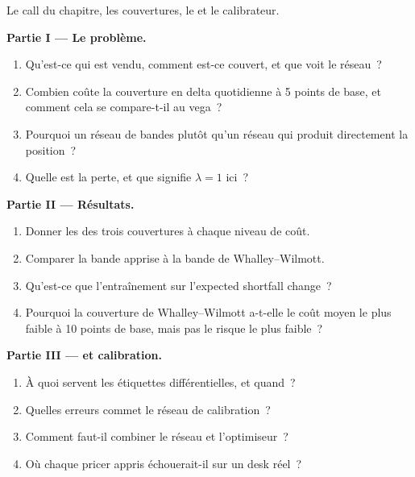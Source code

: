 \begin{problem}\label{pb:ml:deep-hedging-and-machine-learning-in-pricing:1}
Le call du chapitre, les couvertures, le  et le calibrateur.

\medskip\noindent\textbf{Partie I --- Le problème.}
\begin{enumerate}
\item Qu'est-ce qui est vendu, comment est-ce couvert, et que voit le réseau~?
\item Combien coûte la couverture en delta quotidienne à 5 points de base, et comment cela se compare-t-il au vega~?
\item Pourquoi un réseau de bandes plutôt qu'un réseau qui produit directement la position~?
\item Quelle est la perte, et que signifie $\lambda = 1$ ici~?
\end{enumerate}

\medskip\noindent\textbf{Partie II --- Résultats.}
\begin{enumerate}[resume]
\item Donner les  des trois couvertures à chaque niveau de coût.
\item Comparer la bande apprise à la bande de Whalley--Wilmott.
\item Qu'est-ce que l'entraînement sur l'expected shortfall change~?
\item Pourquoi la couverture de Whalley--Wilmott a-t-elle le coût moyen le plus faible à 10 points de base, mais pas le risque le plus faible~?
\end{enumerate}

\medskip\noindent\textbf{Partie III ---  et calibration.}
\begin{enumerate}[resume]
\item À quoi servent les étiquettes différentielles, et quand~?
\item Quelles erreurs commet le réseau de calibration~?
\item Comment faut-il combiner le réseau et l'optimiseur~?
\item Où chaque pricer appris échouerait-il sur un desk réel~?
\end{enumerate}


\end{problem}
